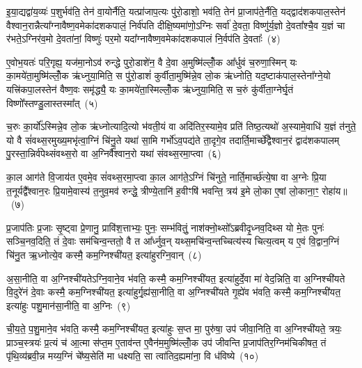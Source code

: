 इ॒या॒द्यद्वा॑य॒व्यः॑ प॒शुर्भव॑ति॒ तेन॑ वा॒योर्नैति॒ यत्प्रा॑जाप॒त्यः पु॑रो॒डाशो॒ भव॑ति॒ तेन॑ प्रा॒जाप॑ते॒र्नैति॒ यद्द्वाद॑श\-कपाल॒स्तेन॑ वैश्वान॒रान्नैत्या᳚ग्नावैष्ण॒वमेका॑\-दश\-कपालं॒ निर्व॑पति दीक्षि॒ष्यमा॑णो॒\-ऽग्निः सर्वा॑ दे॒वता॒ विष्णु॑र्य॒ज्ञो दे॒वता᳚श्चै॒व य॒ज्ञं चा र॑भते॒\-ऽग्निर॑व॒मो दे॒वता॑नां॒ विष्णुः॑ पर॒मो यदा᳚ग्नावैष्ण॒वमेका॑\-दश\-कपालं नि॒र्वप॑ति दे॒वताः᳚~(४)

ए॒वोभ॒यतः॑ परि॒गृह्य॒ यज॑मा॒नो\-ऽव॑ रुन्द्धे पुरो॒डाशे॑न॒ वै दे॒वा अ॒मुष्मि॑ल्लोँ॒क आ᳚र्धुवं च॒रुणा॒स्मिन् यः का॒मये॑ता॒मुष्मि॑ल्लोँ॒क ऋ॑ध्नुया॒मिति॒ स पु॑रो॒डाशं॑ कुर्वीता॒मुष्मि॑न्ने॒व लो॒क ऋ॑ध्नोति॒ यद॒ष्टाक॑पाल॒स्तेना᳚ग्ने॒यो यत्त्रि॑कपा॒लस्तेन॑ वैष्ण॒वः समृ॑द्ध्यै॒ यः का॒मये॑ता॒स्मिल्लोँ॒क ऋ॑ध्नुया॒मिति॒ स च॒रुं कु॑र्वीता॒ग्नेर्घृ॒तं विष्णो᳚स्तण्डु॒लास्तस्मा᳚त्~(५)

च॒रुः का॒र्यो᳚\-ऽस्मिन्ने॒व लो॒क ऋ॑ध्नोत्यादि॒त्यो भ॑वती॒यं वा अदि॑तिर॒स्यामे॒व प्रति॑ तिष्ठ॒त्यथो॑ अ॒स्यामे॒वाधि॑ य॒ज्ञं त॑नुते॒ यो वै सं॑वथ्स॒रमुख्य॒मभृ॑त्वा॒ग्निं चि॑नु॒ते यथा॑ सा॒मि गर्भो॑\-ऽव॒पद्य॑ते ता॒दृगे॒व तदार्ति॒मार्च्छे᳚द्वैश्वान॒रं द्वाद॑श\-कपालम् पु॒रस्ता॒न्निर्व॑पेथ्संवथ्स॒रो वा अ॒ग्निर्वै᳚श्वान॒रो यथा॑ संवथ्स॒रमा॒प्त्वा~(६)

का॒ल आग॑ते वि॒जाय॑त ए॒वमे॒व सं॑वथ्स॒रमा॒प्त्वा का॒ल आग॑ते॒\-ऽग्निं चि॑नुते॒ नार्ति॒मार्च्छ॑त्ये॒षा वा अ॒ग्नेः प्रि॒या त॒नूर्यद्वै᳚श्वान॒रः प्रि॒यामे॒वास्य॑ त॒नुव॒मव॑ रुन्द्धे॒ त्रीण्ये॒तानि॑ ह॒वीꣳषि॑ भवन्ति॒ त्रय॑ इ॒मे लो॒का ए॒षां लो॒काना॒ꣳ॒ रोहा॑य॥~(७)

{\anuvakamend[{य॒द्रिय॑ङ्वा॒युर्यच्छ्म॑श्रु॒णस्तद्वा॒योर्नि॒र्वप॑ति दे॒वता॒स्तस्मा॑दा॒प्त्वाष्टात्रिꣳ॑शच्च}]}%

प्र॒जाप॑तिः प्र॒जाः सृ॒ष्ट्वा प्रे॒णानु॒ प्रावि॑श॒त्ताभ्यः॒ पुनः॒ सम्भ॑वितुं॒ नाश॑क्नो॒थ्सो᳚\-ऽब्रवीदृ॒ध्नव॒दिथ्स यो मे॒तः पुनः॑ सञ्चि॒नव॒दिति॒ तं दे॒वाः सम॑चिन्व॒न्ततो॒ वै त आ᳚र्ध्नुव॒न् यथ्स॒मचि॑न्व॒न्तच्चित्य॑स्य चित्य॒त्वम् य ए॒वं वि॒द्वान॒ग्निं चि॑नु॒त ऋ॒ध्नोत्ये॒व कस्मै॒ कम॒ग्निश्ची॑यत॒ इत्या॑हुरग्नि॒वान्~(८)

अ॒सा॒नीति॒ वा अ॒ग्निश्ची॑यते\-ऽग्नि॒वाने॒व भ॑वति॒ कस्मै॒ कम॒ग्निश्ची॑यत॒ इत्या॑हुर्दे॒वा मा॑ वेद॒न्निति॒ वा अ॒ग्निश्ची॑यते वि॒दुरे॑नं दे॒वाः कस्मै॒ कम॒ग्निश्ची॑यत॒ इत्या॑हुर्गृ॒ह्य॑सा॒नीति॒ वा अ॒ग्निश्ची॑यते गृ॒ह्ये॑व भ॑वति॒ कस्मै॒ कम॒ग्निश्ची॑यत॒ इत्या॑हुः पशु॒मान॑सा॒नीति॒ वा अ॒ग्निः~(९)

ची॒य॒ते॒ प॒शु॒माने॒व भ॑वति॒ कस्मै॒ कम॒ग्निश्ची॑यत॒ इत्या॑हुः स॒प्त मा॒ पुरु॑षा॒ उप॑ जीवा॒निति॒ वा अ॒ग्निश्ची॑यते॒ त्रयः॒ प्राञ्च॒स्त्रयः॑ प्र॒त्यं च॑ आ॒त्मा स॑प्त॒म ए॒ताव॑न्त ए॒वैन॑म॒मुष्मि॑ल्लोँ॒क उप॑ जीवन्ति प्र॒जाप॑तिर॒ग्निम॑चिकीषत॒ तं पृ॑थि॒व्य॑ब्रवी॒न्न मय्य॒ग्निं चे᳚ष्य॒सेति॑ मा धक्ष्यति॒ सा त्वा॑तिद॒ह्यमा॑ना॒ वि ध॑विष्ये~(१०)


